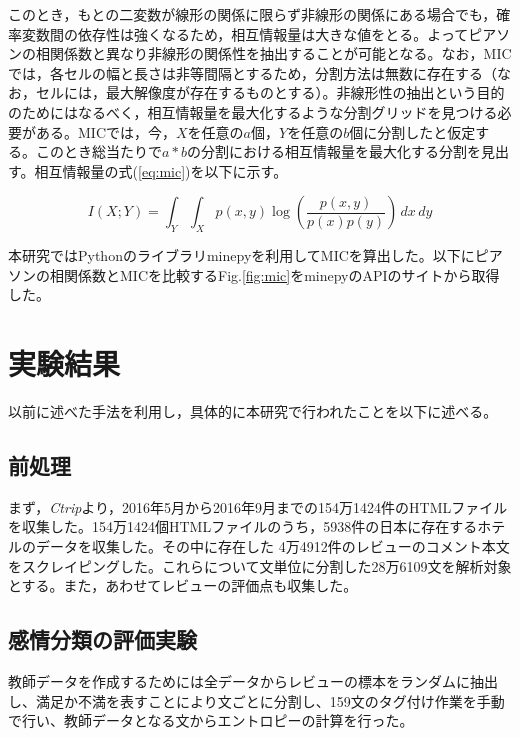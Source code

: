 \documentclass[review]{elsarticle}
\begin{document}
\begin{CJK}{UTF8}{min}
このとき，もとの二変数が線形の関係に限らず非線形の関係にある場合でも，確率変数間の依存性は強くなるため，相互情報量は大きな値をとる。よってピアソンの相関係数と異なり非線形の関係性を抽出することが可能となる。なお，MICでは，各セルの幅と長さは非等間隔とするため，分割方法は無数に存在する（なお，セルには，最大解像度が存在するものとする）。非線形性の抽出という目的のためにはなるべく，相互情報量を最大化するような分割グリッドを見つける必要がある。MICでは，今，\(X\)を任意の\(a\)個，\(Y\)を任意の\(b\)個に分割したと仮定する。このとき総当たりで\(a*b\)の分割における相互情報量を最大化する分割を見出す。相互情報量の式(\ref{eq:mic})を以下に示す。

\begin{equation}\label{eq:mic}
I(X;Y) = \int_{Y}{\int_{X}{p(x,y)\log(\frac{p(x,y)}{p(x)p(y)})}\,dx}\,dy
\end{equation}

本研究ではPythonのライブラリminepy\cite[][]{Albanese2012}を利用してMICを算出した。以下にピアソンの相関係数とMICを比較するFig.\ref{fig:mic}をminepyのAPIのサイトから取得した。

\section{実験結果}\label{results}

以前に述べた手法を利用し，具体的に本研究で行われたことを以下に述べる。

\subsection{前処理}\label{res_preprocessing}

まず，\textit{Ctrip}より，2016年5月から2016年9月までの154万1424件のHTMLファイルを収集した。154万1424個HTMLファイルのうち，5938件の日本に存在するホテルのデータを収集した。その中に存在した 4万4912件のレビューのコメント本文をスクレイピングした。これらについて文単位に分割した28万6109文を解析対象とする。また，あわせてレビューの評価点も収集した。

\subsection{感情分類の評価実験}\label{res_sentiment_analysis}

教師データを作成するためには全データからレビューの標本をランダムに抽出し、満足か不満を表すことにより文ごとに分割し、159文のタグ付け作業を手動で行い、教師データとなる文からエントロピーの計算を行った。


\end{CJK}
\end{document}
